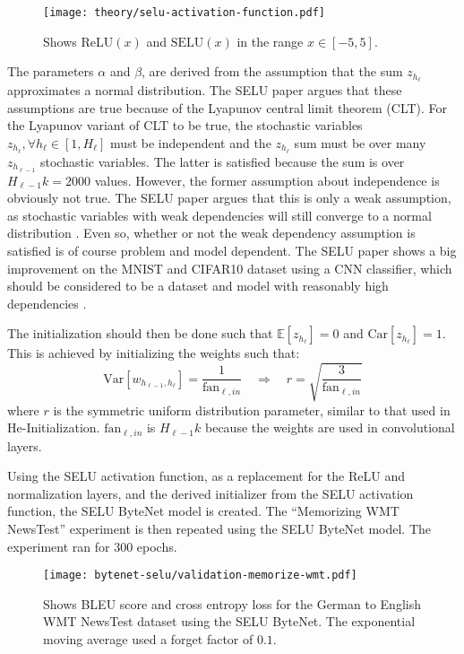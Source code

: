 \begin{figure}[h]
    \centering
    \texttt{[image: theory/selu-activation-function.pdf]}
    \caption{Shows $\mathrm{ReLU}(x)$ and $\mathrm{SELU}(x)$ in the range $x \in [-5, 5]$.}
    \label{fig:result:selu-bytenet:bytenet-selu-activation}
\end{figure}

The parameters $\alpha$ and $\beta$, are derived from the assumption that the sum $z_{h_\ell}$ approximates a normal distribution. The SELU paper argues that these assumptions are true because of the Lyapunov central limit theorem (CLT). For the Lyapunov variant of CLT to be true, the stochastic variables $z_{h_\ell}, \forall h_\ell \in [1, H_\ell]$ must be independent and the $z_{h_\ell}$ sum must be over many $z_{h_{\ell-1}}$ stochastic variables. The latter is satisfied because the sum is over $H_{\ell-1} k = 2000$ values. However, the former assumption about independence is obviously not true. The SELU paper argues that this is only a weak assumption, as stochastic variables with weak dependencies will still converge to a normal distribution \cite{selu, weak-clt}. Even so, whether or not the weak dependency assumption is satisfied is of course problem and model dependent. The SELU paper shows a big improvement on the MNIST and CIFAR10 dataset using a CNN classifier, which should be considered to be a dataset and model with reasonably high dependencies \cite{selu}.

The initialization should then be done such that $\mathbb{E}[z_{h_\ell}] = 0$ and $\mathrm{Car}[z_{h_\ell}] = 1$. This is achieved by initializing the weights such that:
\begin{equation}
\mathrm{Var}[w_{h_{\ell-1}, h_{\ell}}] = \frac{1}{\mathrm{fan}_{\ell, in}} \quad \Rightarrow \quad r = \sqrt{\frac{3}{\mathrm{fan}_{\ell, in}}}
\end{equation}
where $r$ is the symmetric uniform distribution parameter, similar to that used in He-Initialization. $\mathrm{fan}_{\ell, in}$ is $H_{\ell-1} k$ because the weights are used in convolutional layers.

Using the SELU activation function, as a replacement for the ReLU and normalization layers, and the derived initializer from the SELU activation function, the SELU ByteNet model is created. The ``Memorizing WMT NewsTest'' experiment is then repeated using the SELU ByteNet model. The experiment ran for 300 epochs.

\begin{figure}[H]
    \centering
    \texttt{[image: bytenet-selu/validation-memorize-wmt.pdf]}
    \caption{Shows BLEU score and cross entropy loss for the German to English WMT NewsTest dataset using the SELU ByteNet. The exponential moving average used a forget factor of $0.1$.}
    \label{fig:result:selu-bytenet:bytenet-selu-wmt}
\end{figure}

